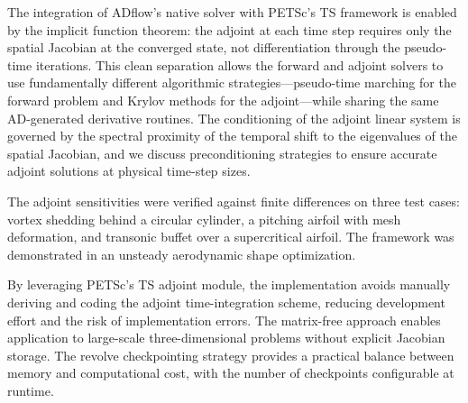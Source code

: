 \documentclass[journal]{new-aiaa}
\begin{document}
The integration of ADflow's native solver with PETSc's TS framework is enabled by the implicit function theorem: the adjoint at each time step requires only the spatial Jacobian at the converged state, not differentiation through the pseudo-time iterations.
This clean separation allows the forward and adjoint solvers to use fundamentally different algorithmic strategies---pseudo-time marching for the forward problem and Krylov methods for the adjoint---while sharing the same AD-generated derivative routines.
The conditioning of the adjoint linear system is governed by the spectral proximity of the temporal shift to the eigenvalues of the spatial Jacobian, and we discuss preconditioning strategies to ensure accurate adjoint solutions at physical time-step sizes.

The adjoint sensitivities were verified against finite differences on three test cases: vortex shedding behind a circular cylinder, a pitching airfoil with mesh deformation, and transonic buffet over a supercritical airfoil.
The framework was demonstrated in an unsteady aerodynamic shape optimization.

By leveraging PETSc's TS adjoint module, the implementation avoids manually deriving and coding the adjoint time-integration scheme, reducing development effort and the risk of implementation errors.
The matrix-free approach enables application to large-scale three-dimensional problems without explicit Jacobian storage.
The revolve checkpointing strategy provides a practical balance between memory and computational cost, with the number of checkpoints configurable at runtime.



\end{document}
